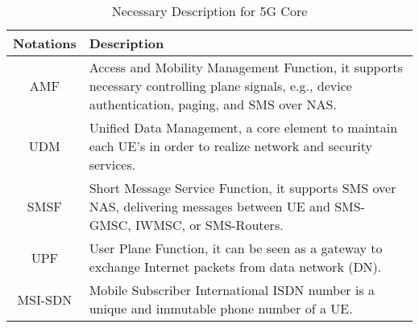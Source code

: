 \begin{table}[t]
	\caption{Necessary Description for 5G Core}\label{tab:5G}
	\centering
	\begin{tabular}{c|p{6cm}}
		\hline
		\textbf{Notations} & \textbf{Description} \\
		\hline
		AMF & Access and Mobility Management Function, it supports necessary controlling plane signals, e.g., device authentication, paging, and SMS over NAS.\\
		UDM & Unified Data Management, a core element to maintain each UE's in order to realize network and security services.\\
		SMSF & Short Message Service Function, it supports SMS over NAS, delivering messages between UE and SMS-GMSC, IWMSC, or SMS-Routers.\\
		UPF & User Plane Function, it can be seen as a gateway to exchange Internet packets from data network (DN).\\
		MSI-SDN & Mobile Subscriber International ISDN number is a unique and immutable phone number of a UE.\\
		\hline
	\end{tabular}
\end{table}

